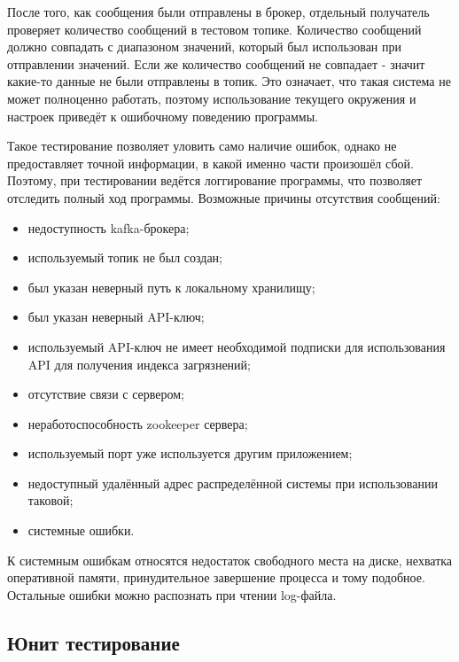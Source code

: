 После того, как сообщения были отправлены в брокер, отдельный получатель проверяет количество сообщений в тестовом топике.
Количество сообщений должно совпадать с диапазоном значений, который был использован при отправлении значений.
Если же количество сообщений не совпадает - значит какие-то данные не были отправлены в топик.
Это означает, что такая система не может полноценно работать, поэтому использование текущего окружения и настроек приведёт к ошибочному поведению программы.

Такое тестирование позволяет уловить само наличие ошибок, однако не предоставляет точной информации, в какой именно части произошёл сбой.
Поэтому, при тестировании ведётся логгирование программы, что позволяет отследить полный ход программы.
Возможные причины отсутствия сообщений:
\begin{itemize}
    \item недоступность kafka-брокера;
    \item используемый топик не был создан;
    \item был указан неверный путь к локальному хранилищу;
    \item был указан неверный API-ключ;
    \item используемый API-ключ не имеет необходимой подписки для использования API для получения индекса загрязнений;
    \item отсутствие связи с сервером;
    \item неработоспособность zookeeper сервера;
    \item используемый порт уже используется другим приложением;
    \item недоступный удалённый адрес распределённой системы при использовании таковой;
    \item системные ошибки.
\end{itemize}

К системным ошибкам относятся недостаток свободного места на диске, нехватка оперативной памяти, принудительное завершение процесса и тому подобное.
Остальные ошибки можно распознать при чтении log-файла.


\subsection{Юнит тестирование}


